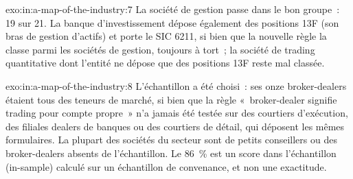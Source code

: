 \begin{solution}{exo:in:a-map-of-the-industry:7}
La société de gestion passe dans le bon groupe~: 19 sur 21. La banque d'investissement dépose également des positions 13F (son
bras de gestion d'actifs) et porte le SIC 6211, si bien que la nouvelle règle la classe parmi les sociétés de gestion, toujours à tort~; la société de trading quantitative
dont l'entité ne dépose que des positions 13F reste mal classée.
\end{solution}

\begin{solution}{exo:in:a-map-of-the-industry:8}
L'échantillon a été choisi~: ses onze broker-dealers étaient tous des teneurs de marché, si bien que la règle «~broker-dealer signifie trading
pour compte propre~» n'a jamais été testée sur des courtiers d'exécution, des filiales dealers de banques ou des courtiers de détail, qui déposent les mêmes formulaires.
La plupart des sociétés du secteur sont de petits conseillers ou des broker-dealers absents de l'échantillon. Le 86~\% est un score dans l'échantillon
(in-sample) calculé sur un échantillon de convenance, et non une exactitude.
\end{solution}


